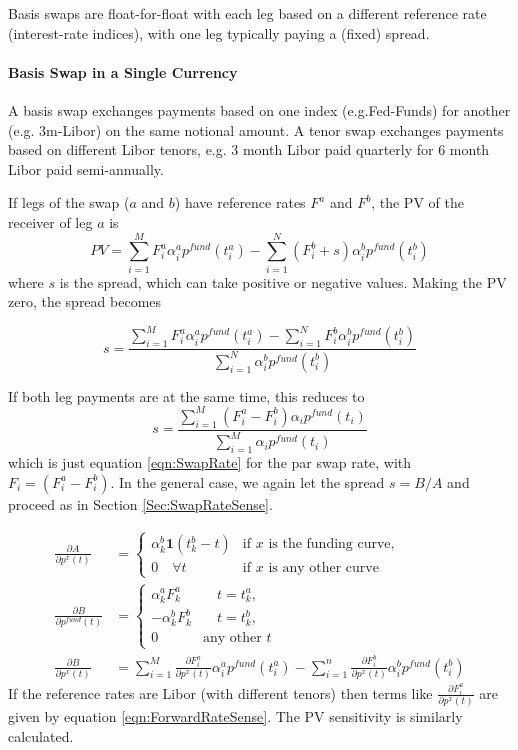 Basis swaps are float-for-float with each leg based on a different reference rate (interest-rate indices), with one leg typically paying a (fixed) spread.

\paragraph{Basis Swap in a Single Currency}

A basis swap exchanges payments based on one index (e.g.Fed-Funds) for another (e.g. 3m-Libor) on the same notional amount. A tenor swap exchanges payments based on different Libor tenors, e.g. 3 month Libor paid quarterly for  6 month Libor paid semi-annually. 

If legs of the swap ($a$ and $b$) have reference rates $F^a$ and $F^b$, the PV of the receiver of leg $a$ is 
\begin{equation}
PV = \sum^M_{i=1} F^a_i \alpha^{a}_ip^{fund}(t^{a}_i) -  \sum^N_{i=1} (F^b_i+s) \alpha^{b}_ip^{fund}(t^{b}_i)
\end{equation}
where $s$ is the spread, which can take positive or negative values. Making the PV zero, the spread becomes
 
 \begin{equation}
s = \frac{\sum^M_{i=1} F^a_i \alpha^{a}_ip^{fund}(t^{a}_i)-\sum^N_{i=1} F^b_i \alpha^{b}_ip^{fund}(t^{b}_i)}{ \sum^N_{i=1} \alpha^{b}_ip^{fund}(t^{b}_i)}
\end{equation}

If both leg payments are at the same time, this reduces to
%
 \begin{equation}
s = \frac{\sum^M_{i=1} (F^a_i-F^b_i) \alpha_ip^{fund}(t_i)}{ \sum^M_{i=1} \alpha_ip^{fund}(t_i)}
\end{equation}
%
which is just equation \ref{eqn:SwapRate} for the par swap rate, with $F_i = (F^a_i-F^b_i)$.  In the general case,  we again let the spread $s=B/A$ and proceed as in Section \ref{Sec:SwapRateSense}.

\begin{align}
\frac{\partial A}{\partial p^{x}(t)}&=
\begin{cases}
\alpha^{b}_k \mathbf{1}(t^{b}_k-t)& \text{if $x$ is the funding curve},\\
0 \quad \forall t & \text{if $x$ is any other curve}
\end{cases}\\
%
\frac{\partial B}{\partial p^{fund}(t)}&=
\begin{cases}
\alpha^{a}_k F^a_k& \quad t=t^a_k,\\
-\alpha^{b}_k F^b_k& \quad t=t^b_k,\\
0& \text{any other }t
\end{cases}\\
%
\frac{\partial B}{\partial p^{x}(t)}&=\sum^M_{i=1} \frac{\partial F^a_i}{\partial p^{x}(t)} \alpha^{a}_ip^{fund}(t^{a}_i) -\sum^n_{i=1} \frac{\partial F^b_i}{\partial p^{x}(t)} \alpha^{b}_ip^{fund}(t^{b}_i) 
\end{align}
%
If  the reference rates are Libor (with different tenors) then terms like $\frac{\partial F^a_i}{\partial p^{x}(t)}$  are given by equation \ref{eqn:ForwardRateSense}. The PV sensitivity is similarly calculated. 

